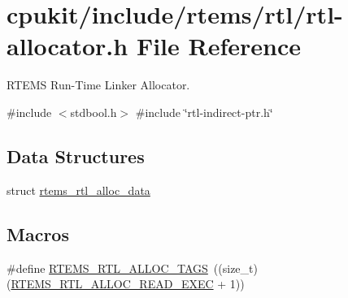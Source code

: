 \hypertarget{rtl-allocator_8h}{}\section{cpukit/include/rtems/rtl/rtl-\/allocator.h File Reference}
\label{rtl-allocator_8h}


R\+T\+E\+MS Run-\/\+Time Linker Allocator.  


{\ttfamily \#include $<$stdbool.\+h$>$}\newline
{\ttfamily \#include \char`\"{}rtl-\/indirect-\/ptr.\+h\char`\"{}}\newline
\subsection*{Data Structures}
\begin{DoxyCompactItemize}
\item 
struct \mbox{\hyperlink{structrtems__rtl__alloc__data}{rtems\+\_\+rtl\+\_\+alloc\+\_\+data}}
\end{DoxyCompactItemize}
\subsection*{Macros}
\begin{DoxyCompactItemize}
\item 
\#define \mbox{\hyperlink{rtl-allocator_8h_a54535608b5611dda0d9f501ac2237b9c}{R\+T\+E\+M\+S\+\_\+\+R\+T\+L\+\_\+\+A\+L\+L\+O\+C\+\_\+\+T\+A\+GS}}~((size\+\_\+t) (\mbox{\hyperlink{rtl-allocator_8h_a7c05573cbeda9e9091ba58ceaf0fa2cca6567664261801bd8497d735196daff91}{R\+T\+E\+M\+S\+\_\+\+R\+T\+L\+\_\+\+A\+L\+L\+O\+C\+\_\+\+R\+E\+A\+D\+\_\+\+E\+X\+EC}} + 1))
\end{DoxyCompactItemize}
